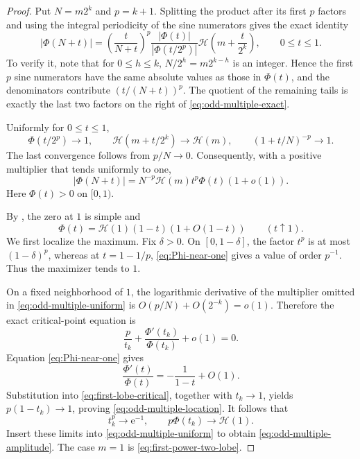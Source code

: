 \documentclass[11pt,oneside]{article}
\numberwithin{equation}{section}
\theoremstyle{definition}
\theoremstyle{remark}
\newcommand{\e}{\mathrm e}
\newcommand{\abs}[1]{\left|#1\right|}
\newcommand{\PhiUp}{\Phi}
\begin{document}
\begin{proof}
Put \(N=m2^k\) and \(p=k+1\).  Splitting the product after its first \(p\) factors and
using the integral periodicity of the sine numerators gives the exact identity
\begin{equation}
 \abs{\PhiUp(N+t)}
 =\left(\frac{t}{N+t}\right)^p
  \frac{\abs{\PhiUp(t)}}{\abs{\PhiUp(t/2^p)}}
  \mathcal H\!\left(m+\frac{t}{2^k}\right),
 \qquad 0\le t\le1.
 \label{eq:odd-multiple-exact}
\end{equation}
To verify it, note that for \(0\le h\le k\), \(N/2^h=m2^{k-h}\) is an integer.  Hence
the first \(p\) sine numerators have the same absolute values as those in \(\PhiUp(t)\),
and the denominators contribute \((t/(N+t))^p\).  The quotient of the remaining tails is
exactly the last two factors on the right of \eqref{eq:odd-multiple-exact}.

Uniformly for \(0\le t\le1\),
\[
 \PhiUp(t/2^p)\to1,
 \qquad
 \mathcal H(m+t/2^k)\to\mathcal H(m),
 \qquad
 (1+t/N)^{-p}\to1.
\]
The last convergence follows from \(p/N\to0\).  Consequently, with a positive multiplier
that tends uniformly to one,
\begin{equation}
 \abs{\PhiUp(N+t)}
 =N^{-p}\mathcal H(m)t^p\PhiUp(t)(1+o(1)).
 \label{eq:odd-multiple-uniform}
\end{equation}
Here \(\PhiUp(t)>0\) on \([0,1)\).

By , the zero at \(1\) is simple and
\begin{equation}
 \PhiUp(t)=\mathcal H(1)(1-t)(1+O(1-t))
 \qquad(t\uparrow1).
 \label{eq:Phi-near-one}
\end{equation}
We first localize the maximum.  Fix \(\delta>0\).  On \([0,1-\delta]\), the factor
\(t^p\) is at most \((1-\delta)^p\), whereas at \(t=1-1/p\),
\eqref{eq:Phi-near-one} gives a value of order \(p^{-1}\).  Thus the maximizer tends to
\(1\).

On a fixed neighborhood of \(1\), the logarithmic derivative of the multiplier omitted in
\eqref{eq:odd-multiple-uniform} is
\(O(p/N)+O(2^{-k})=o(1)\).  Therefore the exact critical-point equation is
\begin{equation}
 \frac{p}{t_k}+\frac{\PhiUp'(t_k)}{\PhiUp(t_k)}+o(1)=0.
 \label{eq:first-lobe-critical}
\end{equation}
Equation \eqref{eq:Phi-near-one} gives
\[
 \frac{\PhiUp'(t)}{\PhiUp(t)}
 =-\frac1{1-t}+O(1).
\]
Substitution into \eqref{eq:first-lobe-critical}, together with \(t_k\to1\), yields
\(p(1-t_k)\to1\), proving \eqref{eq:odd-multiple-location}.  It follows that
\[
 t_k^p\to\e^{-1},
 \qquad
 p\PhiUp(t_k)\to\mathcal H(1).
\]
Insert these limits into \eqref{eq:odd-multiple-uniform} to obtain
\eqref{eq:odd-multiple-amplitude}.  The case \(m=1\) is
\eqref{eq:first-power-two-lobe}.
\end{proof}
\end{document}
